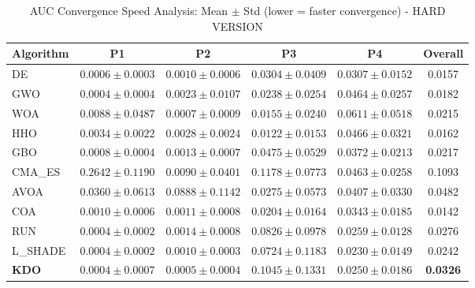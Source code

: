 \begin{table}[htbp]
\centering
\caption{AUC Convergence Speed Analysis: Mean $\pm$ Std (lower = faster convergence) - HARD VERSION}
\label{tab:auc}
\small
\begin{tabular}{lccccc}
\toprule
\textbf{Algorithm} & \textbf{P1} & \textbf{P2} & \textbf{P3} & \textbf{P4} & \textbf{Overall} \\
\midrule
DE & $0.0006 \pm 0.0003$ & $0.0010 \pm 0.0006$ & $0.0304 \pm 0.0409$ & $0.0307 \pm 0.0152$ & 0.0157 \\
GWO & $0.0004 \pm 0.0004$ & $0.0023 \pm 0.0107$ & $0.0238 \pm 0.0254$ & $0.0464 \pm 0.0257$ & 0.0182 \\
WOA & $0.0088 \pm 0.0487$ & $0.0007 \pm 0.0009$ & $0.0155 \pm 0.0240$ & $0.0611 \pm 0.0518$ & 0.0215 \\
HHO & $0.0034 \pm 0.0022$ & $0.0028 \pm 0.0024$ & $0.0122 \pm 0.0153$ & $0.0466 \pm 0.0321$ & 0.0162 \\
GBO & $0.0008 \pm 0.0004$ & $0.0013 \pm 0.0007$ & $0.0475 \pm 0.0529$ & $0.0372 \pm 0.0213$ & 0.0217 \\
CMA_ES & $0.2642 \pm 0.1190$ & $0.0090 \pm 0.0401$ & $0.1178 \pm 0.0773$ & $0.0463 \pm 0.0258$ & 0.1093 \\
AVOA & $0.0360 \pm 0.0613$ & $0.0888 \pm 0.1142$ & $0.0275 \pm 0.0573$ & $0.0407 \pm 0.0330$ & 0.0482 \\
COA & $0.0010 \pm 0.0006$ & $0.0011 \pm 0.0008$ & $0.0204 \pm 0.0164$ & $0.0343 \pm 0.0185$ & 0.0142 \\
RUN & $0.0004 \pm 0.0002$ & $0.0014 \pm 0.0008$ & $0.0826 \pm 0.0978$ & $0.0259 \pm 0.0128$ & 0.0276 \\
L_SHADE & $0.0004 \pm 0.0002$ & $0.0010 \pm 0.0003$ & $0.0724 \pm 0.1183$ & $0.0230 \pm 0.0149$ & 0.0242 \\
\textbf{KDO} & $0.0004 \pm 0.0007$ & $0.0005 \pm 0.0004$ & $0.1045 \pm 0.1331$ & $0.0250 \pm 0.0186$ & \textbf{0.0326} \\
\bottomrule
\end{tabular}
\end{table}
